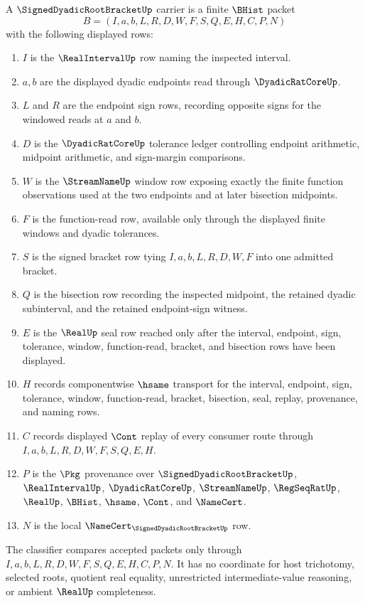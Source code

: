 \begin{definition}
\label{def:signed-dyadic-root-bracket-carrier}
A $\SignedDyadicRootBracketUp$ carrier is a finite $\BHist$ packet
$$
B=(I,a,b,L,R,D,W,F,S,Q,E,H,C,P,N)
$$
with the following displayed rows:
\begin{enumerate}
\item $I$ is the $\RealIntervalUp$ row naming the inspected interval.
\item $a,b$ are the displayed dyadic endpoints read through $\DyadicRatCoreUp$.
\item $L$ and $R$ are the endpoint sign rows, recording opposite signs for the windowed reads at $a$ and $b$.
\item $D$ is the $\DyadicRatCoreUp$ tolerance ledger controlling endpoint arithmetic, midpoint arithmetic, and sign-margin comparisons.
\item $W$ is the $\StreamNameUp$ window row exposing exactly the finite function observations used at the two endpoints and at later bisection midpoints.
\item $F$ is the function-read row, available only through the displayed finite windows and dyadic tolerances.
\item $S$ is the signed bracket row tying $I,a,b,L,R,D,W,F$ into one admitted bracket.
\item $Q$ is the bisection row recording the inspected midpoint, the retained dyadic subinterval, and the retained endpoint-sign witness.
\item $E$ is the $\RealUp$ seal row reached only after the interval, endpoint, sign, tolerance, window, function-read, bracket, and bisection rows have been displayed.
\item $H$ records componentwise $\hsame$ transport for the interval, endpoint, sign, tolerance, window, function-read, bracket, bisection, seal, replay, provenance, and naming rows.
\item $C$ records displayed $\Cont$ replay of every consumer route through $I,a,b,L,R,D,W,F,S,Q,E,H$.
\item $P$ is the $\Pkg$ provenance over $\SignedDyadicRootBracketUp$, $\RealIntervalUp$, $\DyadicRatCoreUp$, $\StreamNameUp$, $\RegSeqRatUp$, $\RealUp$, $\BHist$, $\hsame$, $\Cont$, and $\NameCert$.
\item $N$ is the local $\NameCert_{\SignedDyadicRootBracketUp}$ row.
\end{enumerate}
The classifier compares accepted packets only through $I,a,b,L,R,D,W,F,S,Q,E,H,C,P,N$. It has no coordinate for host trichotomy, selected roots, quotient real equality, unrestricted intermediate-value reasoning, or ambient $\RealUp$ completeness.
\end{definition}

